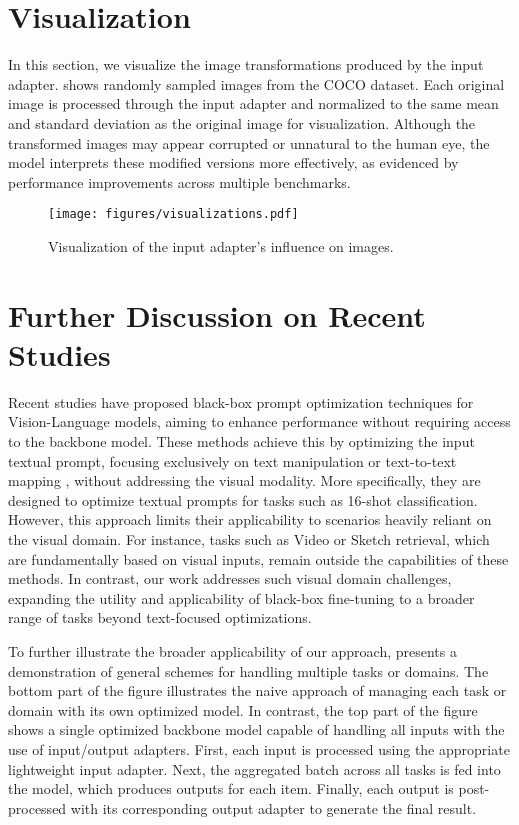 \section{Visualization}
\label{sec:visualizations}
In this section, we visualize the image transformations produced by the input adapter.  shows randomly sampled images from the COCO dataset. Each original image is processed through the input adapter and normalized to the same mean and standard deviation as the original image for visualization. Although the transformed images may appear corrupted or unnatural to the human eye, the model interprets these modified versions more effectively, as evidenced by performance improvements across multiple benchmarks.
\begin{figure*}[ht]
	\centering
	\texttt{[image: figures/visualizations.pdf]}
	\caption{Visualization of the input adapter's influence on images.}
	\label{fig:visualizations}
\end{figure*}

\section{Further Discussion on Recent Studies}
\label{sec:further_discussion}
Recent studies \cite{LiuYLPR24,WangL0WT24} have proposed black-box prompt optimization techniques for Vision-Language models, aiming to enhance performance without requiring access to the backbone model. These methods achieve this by optimizing the input textual prompt, focusing exclusively on text manipulation \cite{WangL0WT24} or text-to-text mapping \cite{LiuYLPR24}, without addressing the visual modality. More specifically, they are designed to optimize textual prompts for tasks such as 16-shot classification. However, this approach limits their applicability to scenarios heavily reliant on the visual domain. For instance, tasks such as Video or Sketch retrieval, which are fundamentally based on visual inputs, remain outside the capabilities of these methods. In contrast, our work addresses such visual domain challenges, expanding the utility and applicability of black-box fine-tuning to a broader range of tasks beyond text-focused optimizations.

To further illustrate the broader applicability of our approach,  presents a demonstration of general schemes for handling multiple tasks or domains. The bottom part of the figure illustrates the naive approach of managing each task or domain with its own optimized model. In contrast, the top part of the figure shows a single optimized backbone model capable of handling all inputs with the use of input/output adapters. First, each input is processed using the appropriate lightweight input adapter. Next, the aggregated batch across all tasks is fed into the model, which produces outputs for each item. Finally, each output is post-processed with its corresponding output adapter to generate the final result.

